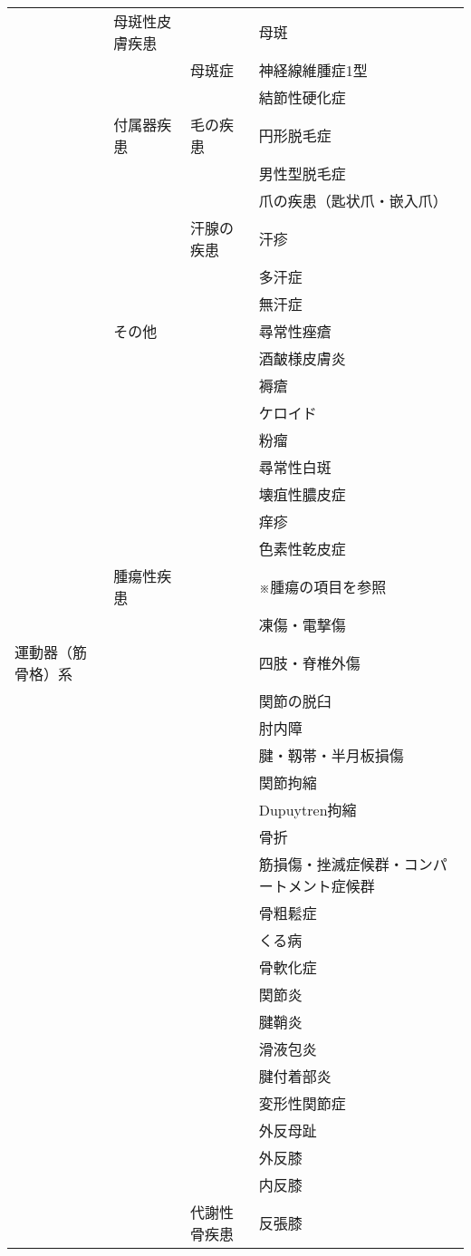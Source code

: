 \begin{xltabular}{\linewidth}{XXXX}
 & 母斑性皮膚疾患 &  & 母斑 \\
 &  & 母斑症 & 神経線維腫症1型 \\
 &  &  & 結節性硬化症 \\
 & 付属器疾患 & 毛の疾患 & 円形脱毛症 \\
 &  &  & 男性型脱毛症 \\
 &  &  & 爪の疾患（匙状爪・嵌入爪） \\
 &  & 汗腺の疾患 & 汗疹 \\
 &  &  & 多汗症 \\
 &  &  & 無汗症 \\
 & その他 &  & 尋常性痤瘡 \\
 &  &  & 酒皶様皮膚炎 \\
 &  &  & 褥瘡 \\
 &  &  & ケロイド \\
 &  &  & 粉瘤 \\
 &  &  & 尋常性白斑 \\
 &  &  & 壊疽性膿皮症 \\
 &  &  & 痒疹 \\
 &  &  & 色素性乾皮症 \\
 & 腫瘍性疾患 &  & ※腫瘍の項目を参照 \\
 &  &  & 凍傷・電撃傷 \\
運動器（筋骨格）系 &  &  & 四肢・脊椎外傷 \\
 &  &  & 関節の脱臼 \\
 &  &  & 肘内障 \\
 &  &  & 腱・靱帯・半月板損傷 \\
 &  &  & 関節拘縮 \\
 &  &  & Dupuytren拘縮 \\
 &  &  & 骨折 \\
 &  &  & 筋損傷・挫滅症候群・コンパートメント症候群 \\
 &  &  & 骨粗鬆症 \\
 &  &  & くる病 \\
 &  &  & 骨軟化症 \\
 &  &  & 関節炎 \\
 &  &  & 腱鞘炎 \\
 &  &  & 滑液包炎 \\
 &  &  & 腱付着部炎 \\
 &  &  & 変形性関節症 \\
 &  &  & 外反母趾 \\
 &  &  & 外反膝 \\
 &  &  & 内反膝 \\
 &  & 代謝性骨疾患 & 反張膝 \\

\end{xltabular}
